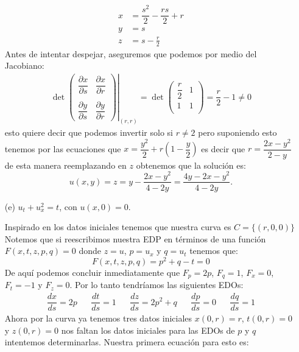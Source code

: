 \begin{homeworkProblem}
\begin{itemize}
\begin{solucion}
        \begin{align*}
            x&=\dfrac{s^2}{2}-\dfrac{rs}{2}+r\\
            y&=s\\
            z&=s-\frac{r}{2}
        \end{align*}
        Antes de intentar despejar, aseguremos que podemos por medio del Jacobiano:
        \begin{align*}
            \left.\det\begin{pmatrix}
                \dfrac{\partial x}{\partial s} & \dfrac{\partial x}{\partial r}\\
            & \\
            \dfrac{\partial y}{\partial s} & \dfrac{\partial y}{\partial r}
            \end{pmatrix}\right|_{(r,r)}=\det\begin{pmatrix}
                \dfrac{r}{2}& 1\\
                1& 1\\
            \end{pmatrix}=\dfrac{r}{2}-1\neq 0
        \end{align*}
        esto quiere decir que podemos invertir solo si $r\neq 2$ pero suponiendo esto tenemos por las ecuaciones que $x=\dfrac{y^2}{2}+r(1-\dfrac{y}{2})$ es decir que $r=\dfrac{2x-y^2}{2-y}$ de esta manera reemplazando en $z$ obtenemos que la solución es:
        $$u(x,y)=z=y-\dfrac{2x-y^2}{4-2y}=\dfrac{4y-2x-y^2}{4-2y}.$$
    \end{solucion}
    \item[(e)] $u_t+u_x^2=t$, con $u(x, 0)=0$.
    \begin{solucion}
        Inspirado en los datos iniciales tenemos que nuestra curva es $C=\{(r,0,0)\}$ Notemos que si reescribimos nuestra EDP en términos de una función $F(x,t,z,p,q)=0$ donde $z=u$, $p=u_x$ y $q=u_t$ tenemos que:
        $$F(x,t,z,p,q)=p^2+q-t=0$$
        De aquí podemos concluir inmediatamente que $F_p=2p$, $F_q=1$, $F_x=0$, $F_t=-1$ y $F_z=0$. Por lo tanto tendríamos las siguientes EDOs:
        \begin{align*}
            \dfrac{dx}{ds}=2p&&
            \dfrac{dt}{ds}=1&&
            \dfrac{dz}{ds}=2p^2+q&&
            \dfrac{dp}{ds}=0&&
            \dfrac{dq}{ds}=1
        \end{align*}
        Ahora por la curva ya tenemos tres datos iniciales $x(0,r)=r$, $t(0,r)=0$ y $z(0,r)=0$ nos faltan los datos iniciales para las EDOs de $p$ y $q$ intentemos determinarlas. Nuestra primera ecuación para esto es:

\end{solucion}
\end{itemize}
\end{homeworkProblem}
